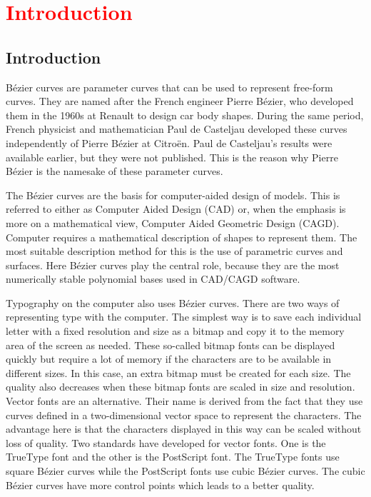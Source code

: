 %
%

\chapter{\textcolor{red}{Introduction}}

\section{Introduction}

Bézier curves are parameter curves that can be used to represent free-form curves. They are named after the French engineer Pierre Bézier, who developed them in the 1960s at Renault to design car body shapes. During the same period, French physicist and mathematician Paul de Casteljau developed these curves independently of Pierre Bézier at Citroën. Paul de Casteljau's results were available earlier, but they were not published. This is the reason why Pierre Bézier is the namesake of these parameter curves.\cite{Farin:2002}

\bigskip


The Bézier curves are the basis for computer-aided design of models. This is referred to either as Computer Aided Design (CAD) or, when the emphasis is more on a mathematical view, Computer Aided Geometric Design (CAGD). \cite{Babovsky:2011} Computer requires a mathematical description of shapes to represent them. The most suitable description method for this is the use of parametric curves and surfaces. Here Bézier curves play the central role, because they are the most numerically stable polynomial bases used in CAD/CAGD software.\cite{Farin:2002}

\bigskip


Typography on the computer also uses Bézier curves. There are two ways of representing type with the computer. The simplest way is to save each individual letter with a fixed resolution and size as a bitmap and copy it to the memory area of the screen as needed. These so-called bitmap fonts can be displayed quickly but require a lot of memory if the characters are to be available in different sizes. In this case, an extra bitmap must be created for each size.  The quality also decreases when these bitmap fonts are scaled in size and resolution. Vector fonts are an alternative. Their name is derived from the fact that they use curves defined in a two-dimensional vector space to represent the characters. The advantage here is that the characters displayed in this way can be scaled without loss of quality. Two standards have developed for vector fonts. One is the TrueType font and the other is the PostScript font.  The TrueType fonts use square Bézier curves while the PostScript fonts use cubic Bézier curves. The cubic Bézier curves have more control points which leads to a better quality.
 
